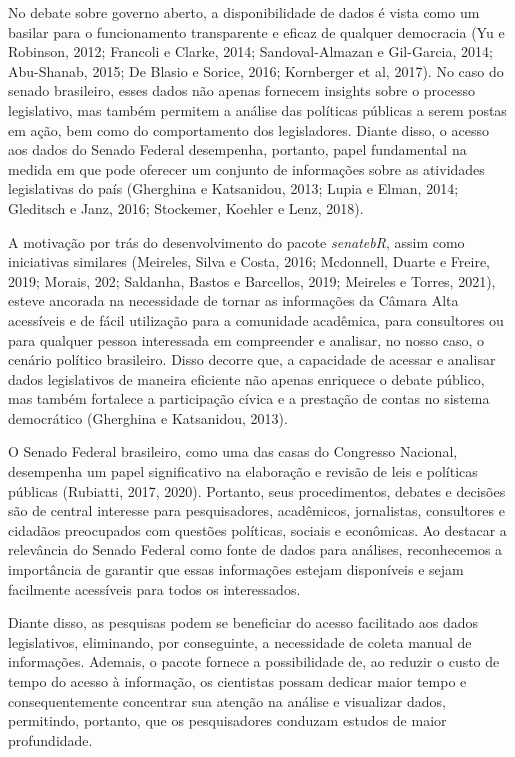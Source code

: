 \documentclass{article}
\begin{document}
No debate sobre governo aberto, a disponibilidade de dados é vista como
um basilar para o funcionamento transparente e eficaz de qualquer
democracia (Yu e Robinson, 2012; Francoli e Clarke, 2014;
Sandoval-Almazan e Gil-Garcia, 2014; Abu-Shanab, 2015; De Blasio e
Sorice, 2016; Kornberger et al, 2017). No caso do senado brasileiro,
esses dados não apenas fornecem insights sobre o processo legislativo,
mas também permitem a análise das políticas públicas a serem postas em
ação, bem como do comportamento dos legisladores. Diante disso, o acesso
aos dados do Senado Federal desempenha, portanto, papel fundamental na
medida em que pode oferecer um conjunto de informações sobre as
atividades legislativas do país (Gherghina e Katsanidou, 2013; Lupia e
Elman, 2014; Gleditsch e Janz, 2016; Stockemer, Koehler e Lenz, 2018).

A motivação por trás do desenvolvimento do pacote \emph{senatebR}, assim
como iniciativas similares (Meireles, Silva e Costa, 2016; Mcdonnell,
Duarte e Freire, 2019; Morais, 202; Saldanha, Bastos e Barcellos, 2019;
Meireles e Torres, 2021), esteve ancorada na necessidade de tornar as
informações da Câmara Alta acessíveis e de fácil utilização para a
comunidade acadêmica, para consultores ou para qualquer pessoa
interessada em compreender e analisar, no nosso caso, o cenário político
brasileiro. Disso decorre que, a capacidade de acessar e analisar dados
legislativos de maneira eficiente não apenas enriquece o debate público,
mas também fortalece a participação cívica e a prestação de contas no
sistema democrático (Gherghina e Katsanidou, 2013).

O Senado Federal brasileiro, como uma das casas do Congresso Nacional,
desempenha um papel significativo na elaboração e revisão de leis e
políticas públicas (Rubiatti, 2017, 2020). Portanto, seus procedimentos,
debates e decisões são de central interesse para pesquisadores,
acadêmicos, jornalistas, consultores e cidadãos preocupados com questões
políticas, sociais e econômicas. Ao destacar a relevância do Senado
Federal como fonte de dados para análises, reconhecemos a importância de
garantir que essas informações estejam disponíveis e sejam facilmente
acessíveis para todos os interessados.

Diante disso, as pesquisas podem se beneficiar do acesso facilitado aos
dados legislativos, eliminando, por conseguinte, a necessidade de coleta
manual de informações. Ademais, o pacote fornece a possibilidade de, ao
reduzir o custo de tempo do acesso à informação, os cientistas possam
dedicar maior tempo e consequentemente concentrar sua atenção na análise
e visualizar dados, permitindo, portanto, que os pesquisadores conduzam
estudos de maior profundidade.
\end{document}
